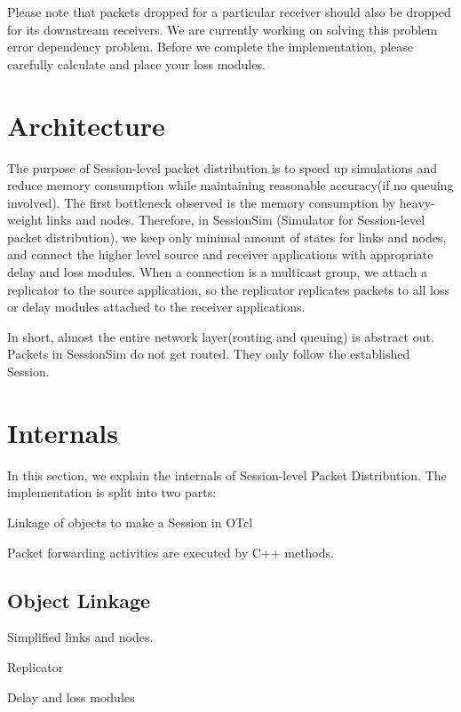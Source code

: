 Please note that packets dropped for a particular receiver should also 
be dropped for its downstream receivers.  We are currently
working on solving this problem error dependency problem.  Before 
we complete the implementation, please carefully calculate and 
place your loss modules.

\section{Architecture}
\label{sec:session-arch}
The purpose of Session-level packet distribution is to
speed up simulations and reduce memory consumption while 
maintaining reasonable accuracy(if no queuing involved).  The first
bottleneck observed is the memory consumption by heavy-weight
links and nodes.  Therefore, in SessionSim (Simulator for Session-level
packet distribution), we keep only minimal amount of 
states for links and nodes, and connect the higher level source and 
receiver applications with appropriate delay and loss modules.  When
a connection is a multicast group, we attach a replicator 
to the source application, so the replicator replicates packets
to all loss or delay modules attached to the receiver applications.

In short, almost the entire network layer(routing and queuing)
is abstract out.  Packets in SessionSim do not get routed.  
They only follow the established Session.

\section{Internals}
In this section, we explain the internals of Session-level Packet 
Distribution.  The implementation is split into two parts:
\begin{list}{}{}
\item  Linkage of objects to make a Session in OTcl 
\item  Packet forwarding activities are executed by C++ methods.  
\end{list}

\subsection{Object Linkage}
\label{sec:session-objlink}

\begin{list}{}{}
\item  Simplified links and nodes.
\item  Replicator
\item  Delay and loss modules
\end{list}

